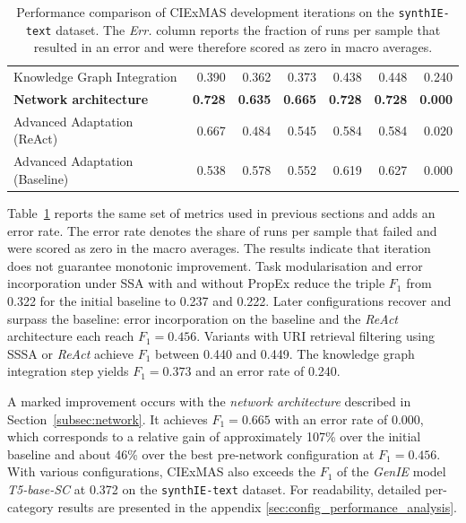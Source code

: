 \documentclass[a4paper,oneside,bibliography=totoc]{scrbook}
\begin{document}
\begin{table}[h]
\begin{tabular}{p{5cm}|rrrrrr}
    Knowledge Graph Integration                  & 0.390                                         & 0.362          & 0.373          & 0.438          & 0.448          & 0.240          \\
    \textbf{Network architecture}                & \textbf{0.728}                                & \textbf{0.635} & \textbf{0.665} & \textbf{0.728} & \textbf{0.728} & \textbf{0.000} \\
    Advanced Adaptation (ReAct)                  & 0.667                                         & 0.484          & 0.545          & 0.584          & 0.584          & 0.020          \\
    Advanced Adaptation (Baseline)               & 0.538                                         & 0.578          & 0.552          & 0.619          & 0.627          & 0.000          \\
    \bottomrule
  \end{tabular}
  \caption{Performance comparison of CIExMAS development iterations on the \texttt{synthIE-text} dataset. The \emph{Err.} column reports the fraction of runs per sample that resulted in an error and were therefore scored as zero in macro averages.}
  \label{tab:evaluation_iterations}
\end{table}

Table~\ref{tab:evaluation_iterations} reports the same set of metrics used in previous sections and adds an error rate. The error rate denotes the share of runs per sample that failed and were scored as zero in the macro averages. The results indicate that iteration does not guarantee monotonic improvement. Task modularisation and error incorporation under \ac{SSA} with and without \ac{PropEx} reduce the triple $F_1$ from 0.322 for the initial baseline to 0.237 and 0.222. Later configurations recover and surpass the baseline: error incorporation on the baseline and the \textit{ReAct} architecture each reach $F_1=0.456$. Variants with URI retrieval filtering using \ac{SSSA} or \textit{ReAct} achieve $F_1$ between 0.440 and 0.449. The knowledge graph integration step yields $F_1=0.373$ and an error rate of 0.240.

A marked improvement occurs with the \textit{network architecture} described in Section~\ref{subsec:network}. It achieves $F_1=0.665$ with an error rate of 0.000, which corresponds to a relative gain of approximately 107\% over the initial baseline and about 46\% over the best pre-network configuration at $F_1=0.456$. With various configurations, CIExMAS also exceeds the $F_1$ of the \textit{GenIE} model \textit{T5-base-SC} at 0.372 on the \texttt{synthIE-text} dataset. For readability, detailed per-category results are presented in the appendix \ref{sec:config_performance_analysis}.
\end{document}
